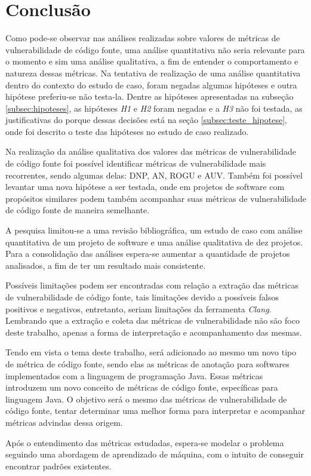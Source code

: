 \chapter{Conclusão} \label{chap:conclusao}

Como pode-se observar nas análises realizadas sobre valores de métricas de
vulnerabilidade de código fonte, uma análise quantitativa não seria relevante
para o momento e sim uma análise qualitativa, a fim de entender o comportamento
e natureza dessas métricas. Na tentativa de realização de uma análise
quantitativa dentro do contexto do estudo de caso, foram negadas algumas
hipóteses e outra hipótese preferiu-se não testa-la. Dentre as hipóteses
apresentadas na subseção \ref{subsec:hipoteses}, as hipóteses \emph{H1} e \emph{H2}
foram negadas e a \emph{H3} não foi testada, as justificativas do porque dessas
decisões está na seção \ref{subsec:teste_hipotese}, onde foi descrito o teste
das hipóteses no estudo de caso realizado.

Na realização da análise qualitativa dos valores das métricas de vulnerabilidade
de código fonte foi possível identificar métricas de vulnerabilidade mais
recorrentes, sendo algumas delas: DNP, AN, ROGU e AUV. Também foi possível
levantar uma nova hipótese a ser testada, onde em projetos de software com
propósitos similares podem também acompanhar suas métricas de vulnerabilidade de
código fonte de maneira semelhante.

A pesquisa limitou-se a uma revisão bibliográfica, um estudo de caso com análise 
quantitativa de um projeto de software e uma análise qualitativa de dez
projetos. Para a consolidação das análises espera-se aumentar a quantidade de
projetos analisados, a fim de ter um resultado mais consistente.

Possíveis limitações podem ser encontradas com relação a extração das métricas
de vulnerabilidade de código fonte, tais limitações devido a possíveis falsos
positivos e negativos, entretanto, seriam limitações da ferramenta \emph{Clang}.
Lembrando que a extração e coleta das métricas de vulnerabilidade não são foco
deste trabalho, apenas a forma de interpretação e acompanhamento das mesmas.

Tendo em vista o tema deste trabalho, será adicionado ao mesmo um novo tipo de
métrica de código fonte, sendo elas as
métricas de anotação para softwares implementados com a linguagem de programação
Java. Essas métricas introduzem um novo conceito de métricas de código fonte,
específicas para linguagem Java. O objetivo será o mesmo das métricas de
vulnerabilidade de código fonte, tentar determinar uma melhor forma para
interpretar e acompanhar métricas advindas dessa origem.

Após o entendimento das métricas estudadas, espera-se 
modelar o problema seguindo uma abordagem de aprendizado de
máquina, com o intuito de conseguir encontrar padrões existentes.


